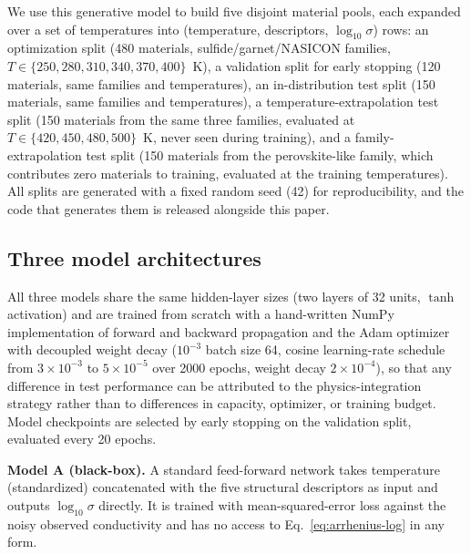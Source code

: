 \documentclass[11pt]{article}
\begin{document}
We use this generative model to build five disjoint material pools, each expanded over a set of temperatures into (temperature, descriptors, $\log_{10}\sigma$) rows: an optimization split (480 materials, sulfide/garnet/NASICON families, $T\in\{250,280,310,340,370,400\}$~K), a validation split for early stopping (120 materials, same families and temperatures), an in-distribution test split (150 materials, same families and temperatures), a temperature-extrapolation test split (150 materials from the same three families, evaluated at $T\in\{420,450,480,500\}$~K, never seen during training), and a family-extrapolation test split (150 materials from the perovskite-like family, which contributes zero materials to training, evaluated at the training temperatures). All splits are generated with a fixed random seed (42) for reproducibility, and the code that generates them is released alongside this paper.

\subsection{Three model architectures}
\label{sec:models}

All three models share the same hidden-layer sizes (two layers of 32 units, $\tanh$ activation) and are trained from scratch with a hand-written NumPy implementation of forward and backward propagation and the Adam optimizer with decoupled weight decay ($10^{-3}$ batch size 64, cosine learning-rate schedule from $3\times10^{-3}$ to $5\times10^{-5}$ over 2000 epochs, weight decay $2\times10^{-4}$), so that any difference in test performance can be attributed to the physics-integration strategy rather than to differences in capacity, optimizer, or training budget. Model checkpoints are selected by early stopping on the validation split, evaluated every 20 epochs.

\textbf{Model A (black-box).} A standard feed-forward network takes temperature (standardized) concatenated with the five structural descriptors as input and outputs $\log_{10}\sigma$ directly. It is trained with mean-squared-error loss against the noisy observed conductivity and has no access to Eq.~\ref{eq:arrhenius-log} in any form.
\end{document}
